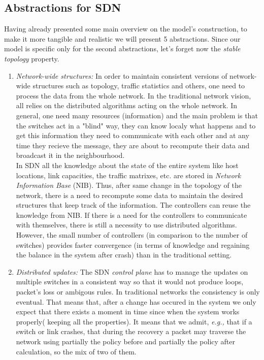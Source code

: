 \documentclass{article}
\theoremstyle{remark}
\begin{document}
\subsection{Abstractions for SDN}
Having already presented some main overview on the model's construction, to make it more tangible and realistic we will present 5 abstractions. Since our model is specific only for the second abstractions, let's forget now the \emph{stable topology} property.
\begin{enumerate}
\item \emph{Network-wide structures:}
In order to maintain consistent versions of network-wide structures such as topology, traffic statistics and others, one need to process the data from the whole network. In the traditional network vision, all relies on the distributed algorithms acting on the whole network. In general, one need many resources (information) and the main problem is that the switches act in a "blind" way, they can know localy what happens and to get this information they need to communicate with each other and at any time they recieve the message, they are about to recompute their data and broadcast it in the neighbourhood. \\
In SDN all the knowledge about the state of the entire  system like host locations, link capacities, the traffic matrixes, etc. are stored in \emph{Network Information Base} (NIB). Thus, after same change in the topology of the network, there is a need to recompute some data to maintain the desired structures that keep track of the information. The controllers can reuse the knowledge from NIB. If there is a need for the controllers to communicate with themselves, there is still a necessity to use distributed algorithms. However, the small number of controllers (in comparison to the number of switches) provides faster convergence (in terms of knowledge and regaining the balance in the system after crash) than in the traditional setting.  
\item \emph{Distributed updates:}
The SDN \emph{control plane} has to manage the updates on multiple switches in a consistent way so that it would not produce loops, packet's loss or ambigous rules. 
In traditional networks the consistency is only eventual. That means that, after a change has occured in the system we only expect that there exists a moment in time since when the system works properly( keeping all the properties). It means that we admit, \emph{e.g.,} that if a switch or link crashes, that during the recovery a packet may traverse the network using partially the policy before and partially the policy after calculation, so the mix of two of them. 

\end{enumerate}
\end{document}
